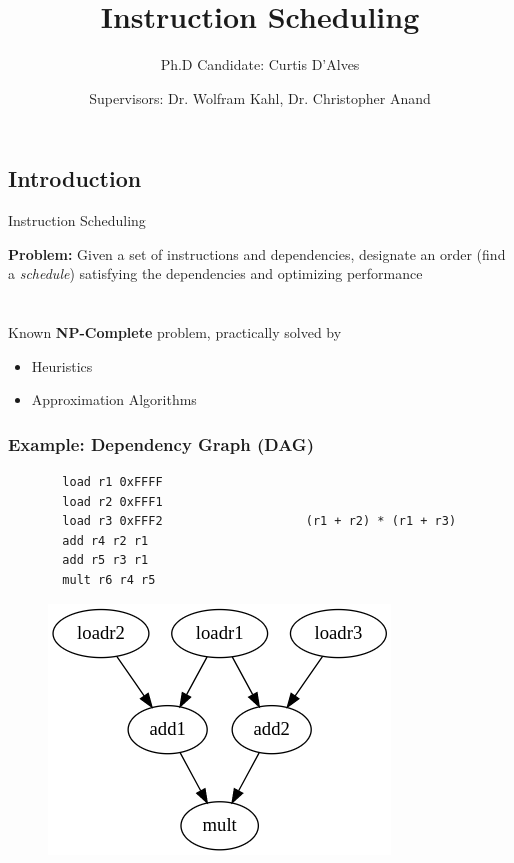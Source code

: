 \documentclass{beamer}
\title{\normalsize Instruction Scheduling} %
\subtitle{Ph.D Candidate: Curtis D'Alves} %
\author{Supervisors: Dr. Wolfram Kahl, Dr. Christopher Anand}
\begin{document}
  \frame{\maketitle}


  \begin{darkframes}
    \section{Introduction}
\begin{frame}{Instruction Scheduling}

	{\color{cyan} \bf Problem:} Given a set of instructions and dependencies, designate an order (find a {\it schedule}) satisfying the dependencies and optimizing performance
	\pause
	\qquad \\
	\qquad \\
	\qquad \\
	Known {\bf \color{green} NP-Complete} problem, practically solved by
	\begin{itemize}
		\item Heuristics
		\item Approximation Algorithms
	\end{itemize}
\end{frame}      

\begin{frame}[fragile]
  \frametitle{Example: Dependency Graph (DAG)}

  \begin{figure}
  \begin{lstlisting}
  load r1 0xFFFF
  load r2 0xFFF1
  load r3 0xFFF2                    (r1 + r2) * (r1 + r3)
  add r4 r2 r1
  add r5 r3 r1
  mult r6 r4 r5
  \end{lstlisting} 
    \includegraphics[scale=0.3]{figures/depgraph.png}
  \end{figure}
\end{frame}


\end{darkframes}
\end{document}
